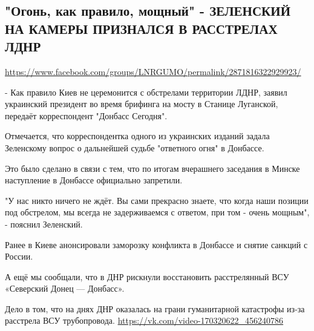  
 

\subsection{"Огонь, как правило, мощный" - ЗЕЛЕНСКИЙ НА КАМЕРЫ ПРИЗНАЛСЯ В РАССТРЕЛАХ ЛДНР}
\label{sec:24_07_2020.fb.lnr.7}
\url{https://www.facebook.com/groups/LNRGUMO/permalink/2871816322929923/}


- Как правило Киев не церемонится с обстрелами территории ЛДНР, заявил
украинский президент во время брифинга на мосту в Станице Луганской, передаёт
корреспондент "Донбасс Сегодня".

Отмечается, что корреспондентка одного из украинских изданий задала Зеленскому
вопрос о дальнейшей судьбе "ответного огня" в Донбассе.

Это было сделано в связи с тем, что по итогам вчерашнего заседания в Минске
наступление в Донбассе официально запретили.

"У нас никто ничего не ждёт. Вы сами прекрасно знаете, что когда наши позиции
под обстрелом, мы всегда не задерживаемся с ответом, при том - очень мощным", -
пояснил Зеленский.

Ранее в Киеве анонсировали заморозку конфликта в Донбассе и снятие санкций с
России.

А ещё мы сообщали, что в ДНР рискнули восстановить расстрелянный ВСУ «Северский
Донец --- Донбасс».

Дело в том, что на днях ДНР оказалась на грани гуманитарной катастрофы из-за
расстрела ВСУ трубопровода.  \url{https://vk.com/video-170320622_456240786}
  

